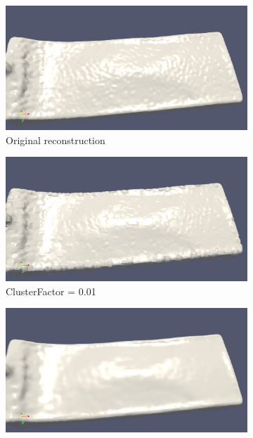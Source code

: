 \begin{figure}[H]
	\begin{center}
		\begin{subfigure}[b]{0.46\textwidth}
			\includegraphics[width=\textwidth]{figures/MlsSparseClustersOriginalpng.png}
			\caption{Original reconstruction} \label{fig:mls_clusters_original}
		\end{subfigure}
		\begin{subfigure}[b]{0.46\textwidth}
			\includegraphics[width=\textwidth]{figures/MlsSparseClusters0.01.png}
			\caption{ClusterFactor = 0.01} \label{fig:mls_clusters_sparse_0.01}
		\end{subfigure}
		\begin{subfigure}[b]{0.46\textwidth}
			\includegraphics[width=\textwidth]{figures/MlsSparseClusters0.5.png}

\end{subfigure}
\end{center}
\end{figure}
